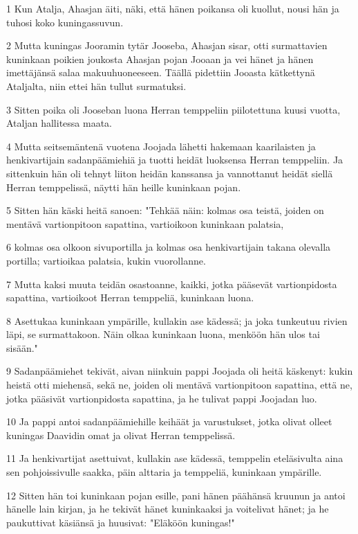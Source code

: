 \par 1 Kun Atalja, Ahasjan äiti, näki, että hänen poikansa oli kuollut, nousi hän ja tuhosi koko kuningassuvun.
\par 2 Mutta kuningas Jooramin tytär Jooseba, Ahasjan sisar, otti surmattavien kuninkaan poikien joukosta Ahasjan pojan Jooaan ja vei hänet ja hänen imettäjänsä salaa makuuhuoneeseen. Täällä pidettiin Jooasta kätkettynä Ataljalta, niin ettei hän tullut surmatuksi.
\par 3 Sitten poika oli Jooseban luona Herran temppeliin piilotettuna kuusi vuotta, Ataljan hallitessa maata.
\par 4 Mutta seitsemäntenä vuotena Joojada lähetti hakemaan kaarilaisten ja henkivartijain sadanpäämiehiä ja tuotti heidät luoksensa Herran temppeliin. Ja sittenkuin hän oli tehnyt liiton heidän kanssansa ja vannottanut heidät siellä Herran temppelissä, näytti hän heille kuninkaan pojan.
\par 5 Sitten hän käski heitä sanoen: "Tehkää näin: kolmas osa teistä, joiden on mentävä vartionpitoon sapattina, vartioikoon kuninkaan palatsia,
\par 6 kolmas osa olkoon sivuportilla ja kolmas osa henkivartijain takana olevalla portilla; vartioikaa palatsia, kukin vuorollanne.
\par 7 Mutta kaksi muuta teidän osastoanne, kaikki, jotka pääsevät vartionpidosta sapattina, vartioikoot Herran temppeliä, kuninkaan luona.
\par 8 Asettukaa kuninkaan ympärille, kullakin ase kädessä; ja joka tunkeutuu rivien läpi, se surmattakoon. Näin olkaa kuninkaan luona, menköön hän ulos tai sisään."
\par 9 Sadanpäämiehet tekivät, aivan niinkuin pappi Joojada oli heitä käskenyt: kukin heistä otti miehensä, sekä ne, joiden oli mentävä vartionpitoon sapattina, että ne, jotka pääsivät vartionpidosta sapattina, ja he tulivat pappi Joojadan luo.
\par 10 Ja pappi antoi sadanpäämiehille keihäät ja varustukset, jotka olivat olleet kuningas Daavidin omat ja olivat Herran temppelissä.
\par 11 Ja henkivartijat asettuivat, kullakin ase kädessä, temppelin eteläsivulta aina sen pohjoissivulle saakka, päin alttaria ja temppeliä, kuninkaan ympärille.
\par 12 Sitten hän toi kuninkaan pojan esille, pani hänen päähänsä kruunun ja antoi hänelle lain kirjan, ja he tekivät hänet kuninkaaksi ja voitelivat hänet; ja he paukuttivat käsiänsä ja huusivat: "Eläköön kuningas!"
